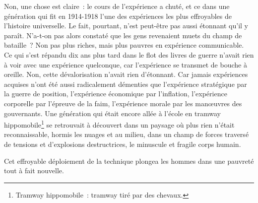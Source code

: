 {Non, une chose est claire~: le cours de l'expérience a chuté, et ce
dans une génération qui fit en 1914-1918 l'une des expériences les
plus effroyables de l'histoire universelle. Le fait, pourtant, n'est
peut-être pas aussi étonnant qu'il y paraît. N'a-t-on pas alors
constaté que les gens revenaient muets du champ de bataille~? Non pas
plus riches, mais plus pauvres en expérience communicable. Ce qui
s'est répandu dix ans plus tard dans le flot des livres de guerre
n'avait rien à voir avec une expérience quelconque, car l'expérience
se transmet de bouche à oreille. Non, cette dévalorisation n'avait
rien d'étonnant. Car jamais expériences acquises n'ont été aussi
radicalement démenties que l'expérience stratégique par la guerre de
position, l'expérience économique par l'inflation, l'expérience
corporelle par l'épreuve de la faim, l'expérience morale par les
manœuvres des gouvernants. Une génération qui était encore allée à
l'école en tramway hippomobile\footnote{Tramway hippomobile~: tramway
tiré par des chevaux.} se retrouvait à découvert dans un paysage où
plus rien n'était reconnaissable, hormis les nuages et au milieu,
dans un champ de forces traversé de tensions et d'explosions
destructrices, le minuscule et fragile corps humain.

Cet effroyable déploiement de la technique plongea les hommes dans une
pauvreté tout à fait nouvelle.
}


